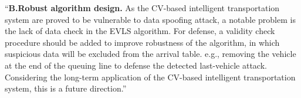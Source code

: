 \documentclass{amsart}
\theoremstyle{definition}
\theoremstyle{remark}
\numberwithin{equation}{section}
\begin{document}
``\textbf{B.Robust algorithm design.} As the CV-based intelligent transportation system are proved to be vulnerable to data spoofing attack, a notable problem is the lack of data check in the EVLS algorithm. For defense, a validity check procedure should be added to improve robustness of the algorithm, in which suspicious data will be excluded from the arrival table. e.g., removing the vehicle at the end of the queuing line to defense the detected last-vehicle attack. Considering the long-term application of the CV-based intelligent transportation system, this is a future direction.''
\end{document}
